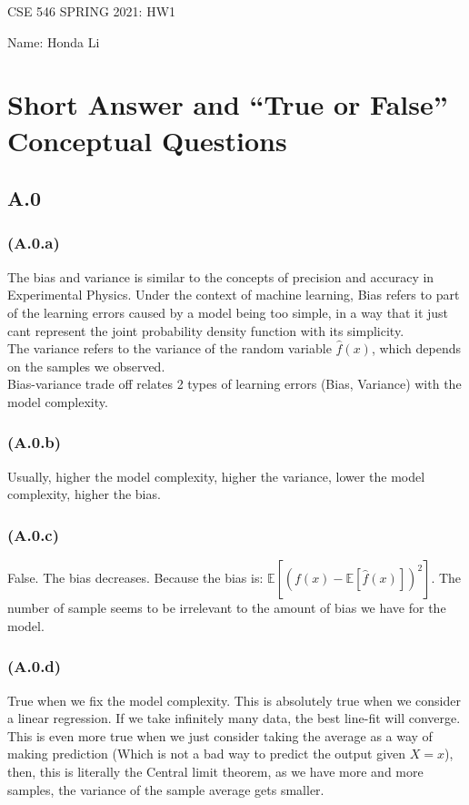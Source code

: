 \documentclass[]{article}
\begin{document}
\begin{center}
    CSE 546 SPRING 2021: HW1 
\end{center}
\begin{center}
    Name: Honda Li
\end{center}

\section*{Short Answer and ``True or False'' Conceptual Questions}
    \subsection*{A.0}
        \subsubsection*{(A.0.a)}
            The bias and variance is similar to the concepts of precision and accuracy in Experimental Physics. Under the context of machine learning, Bias refers to part of the learning errors caused by a model being too simple, in a way that it just cant represent the joint probability density function with its simplicity. 
            \\[1em]
            The variance refers to the variance of the random variable $\hat{f}(x)$, which depends on the samples we observed. 
            \\[1em]
            Bias-variance trade off relates 2 types of learning errors (Bias, Variance) with the model complexity. 
        \subsubsection*{(A.0.b)}
            Usually, higher the model complexity, higher the variance, lower the model complexity, higher the bias. 
        \subsubsection*{(A.0.c)}
            False. The bias decreases. Because the bias is: $\mathbb{E}\left[
                \left(
                f(x) - \mathbb{E}\left[\hat{f}(x)\right]
                \right)^2
            \right]$. The number of sample seems to be irrelevant to the amount of bias we have for the model. 
        \subsubsection*{(A.0.d)}
            True when we fix the model complexity. This is absolutely true when we consider a linear regression. If we take infinitely many data, the best line-fit will converge. 
            \\[1em]
            This is even more true when we just consider taking the average as a way of making prediction (Which is not a bad way to predict the output given $X = x$), then, this is literally the Central limit theorem, as we have more and more samples, the variance of the sample average gets smaller. 
\end{document}
